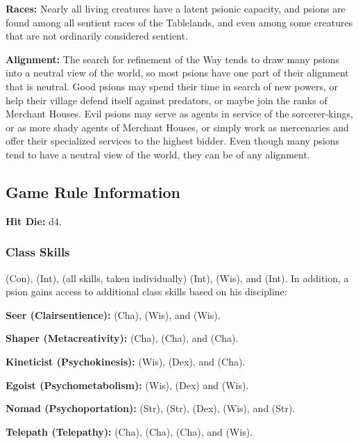 \textbf{Races:} Nearly all living creatures have a latent psionic capacity, and psions are found among all sentient races of the Tablelands, and even among some creatures that are not ordinarily considered sentient.

\textbf{Alignment:} The search for refinement of the Way tends to draw many psions into a neutral view of the world, so most psions have one part of their alignment that is neutral. Good psions may spend their time in search of new powers, or help their village defend itself against predators, or maybe join the ranks of Merchant Houses. Evil psions may serve as agents in service of the sorcerer-kings, or as more shady agents of Merchant Houses, or simply work as mercenaries and offer their specialized services to the highest bidder. Even though many psions tend to have a neutral view of the world, they can be of any alignment.

\subsection{Game Rule Information}

\textbf{Hit Die:} d4.

\subsubsection{Class Skills}

 (Con),  (Int),  (all skills, taken individually) (Int),  (Wis), and  (Int). In addition, a psion gains access to additional class skills based on his discipline:

\textbf{Seer (Clairsentience):}  (Cha),  (Wis), and  (Wis).

\textbf{Shaper (Metacreativity):}  (Cha),  (Cha), and  (Cha).

\textbf{Kineticist (Psychokinesis):}  (Wis),  (Dex), and  (Cha).

\textbf{Egoist (Psychometabolism):}  (Wis),  (Dex) and  (Wis).

\textbf{Nomad (Psychoportation):}  (Str),  (Str),  (Dex),  (Wis), and  (Str).

\textbf{Telepath (Telepathy):}  (Cha),  (Cha),  (Cha), and  (Wis).

